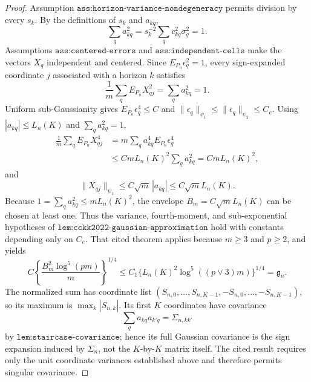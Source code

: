 \documentclass{article}
\begin{document}
\begin{proof}
Assumption \(\texttt{ass:horizon-variance-nondegeneracy}\) permits
division by every \(s_k\).  By the definitions of \(s_k\) and \(a_{kq}\),
\[
 \sum_q a_{kq}^2
 =s_k^{-2}\sum_qc_{kq}^2\sigma_q^2=1.
\]
Assumptions \(\texttt{ass:centered-errors}\) and
\(\texttt{ass:independent-cells}\) make the vectors \(X_q\) independent
and centered.  Since \(E_{P_n}\epsilon_q^2=1\), every sign-expanded
coordinate \(j\) associated with a horizon \(k\) satisfies
\[
 \frac1m\sum_qE_{P_n}X_{qj}^2
 =\sum_q a_{kq}^2=1.
\]
Uniform sub-Gaussianity gives
\(E_{P_n}\epsilon_q^4\le C\) and
\(\|\epsilon_q\|_{\psi_1}\le\|\epsilon_q\|_{\psi_2}\le C_e\).
Using \(|a_{kq}|\le L_n(K)\) and \(\sum_qa_{kq}^2=1\),
\[
 \begin{aligned}
 \frac1m\sum_qE_{P_n}X_{qj}^4
 &=m\sum_qa_{kq}^4E_{P_n}\epsilon_q^4\\
 &\le CmL_n(K)^2\sum_qa_{kq}^2
 =CmL_n(K)^2,
 \end{aligned}
\]
and
\[
 \|X_{qj}\|_{\psi_1}
 \le C\sqrt m\,|a_{kq}|
 \le C\sqrt mL_n(K).
\]
Because \(1=\sum_qa_{kq}^2\le mL_n(K)^2\), the envelope
\(B_m=C\sqrt mL_n(K)\) can be chosen at least one.  Thus the variance,
fourth-moment, and sub-exponential hypotheses of
\(\texttt{lem:cckk2022-gaussian-approximation}\) hold with constants
depending only on \(C_e\).  That cited theorem applies because
\(m\ge3\) and \(p\ge2\), and yields
\[
 C\left\{\frac{B_m^2\log^5(pm)}m\right\}^{1/4}
 \le C_1\{L_n(K)^2\log^5((p\vee3)m)\}^{1/4}
 =\mathfrak g_n.
\]
The normalized sum has coordinate list
\((S_{n,0},\ldots,S_{n,K-1},-S_{n,0},\ldots,-S_{n,K-1})\), so its
maximum is \(\max_k|S_{n,k}|\).  Its first \(K\) coordinates have
covariance
\[
 \sum_q a_{kq}a_{k'q}=\Sigma_{n,kk'}
\]
by \(\texttt{lem:staircase-covariance}\); hence its full Gaussian
covariance is the sign expansion induced by \(\Sigma_n\), not the
\(K\)-by-\(K\) matrix itself.  The cited result requires only the unit
coordinate variances established above and therefore permits singular
covariance.


\end{proof}
\end{document}
